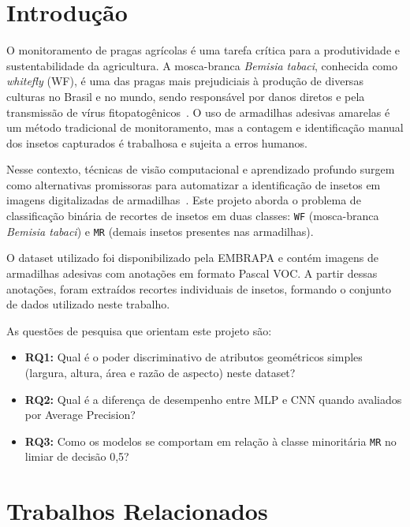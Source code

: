 \documentclass[conference]{IEEEtran}
\begin{document}
\section{Introdução}

O monitoramento de pragas agrícolas é uma tarefa crítica para a
produtividade e sustentabilidade da agricultura. A mosca-branca
\textit{Bemisia tabaci}, conhecida como \textit{whitefly} (WF), é uma
das pragas mais prejudiciais à produção de diversas culturas no Brasil
e no mundo, sendo responsável por danos diretos e pela transmissão de
vírus fitopatogênicos~\cite{barbedo2014}. O uso de armadilhas adesivas
amarelas é um método tradicional de monitoramento, mas a contagem e
identificação manual dos insetos capturados é trabalhosa e sujeita a
erros humanos.

Nesse contexto, técnicas de visão computacional e aprendizado profundo
surgem como alternativas promissoras para automatizar a identificação de
insetos em imagens digitalizadas de armadilhas~\cite{jige2017}. Este
projeto aborda o problema de classificação binária de recortes de insetos
em duas classes: \texttt{WF} (mosca-branca \textit{Bemisia tabaci}) e
\texttt{MR} (demais insetos presentes nas armadilhas).

O dataset utilizado foi disponibilizado pela EMBRAPA e contém imagens de
armadilhas adesivas com anotações em formato Pascal VOC. A partir dessas
anotações, foram extraídos recortes individuais de insetos, formando o
conjunto de dados utilizado neste trabalho.

As questões de pesquisa que orientam este projeto são:
\begin{itemize}
    \item \textbf{RQ1:} Qual é o poder discriminativo de atributos geométricos
    simples (largura, altura, área e razão de aspecto) neste dataset?
    \item \textbf{RQ2:} Qual é a diferença de desempenho entre MLP e CNN
    quando avaliados por Average Precision?
    \item \textbf{RQ3:} Como os modelos se comportam em relação à classe
    minoritária \texttt{MR} no limiar de decisão 0,5?
\end{itemize}

\section{Trabalhos Relacionados}
\end{document}

